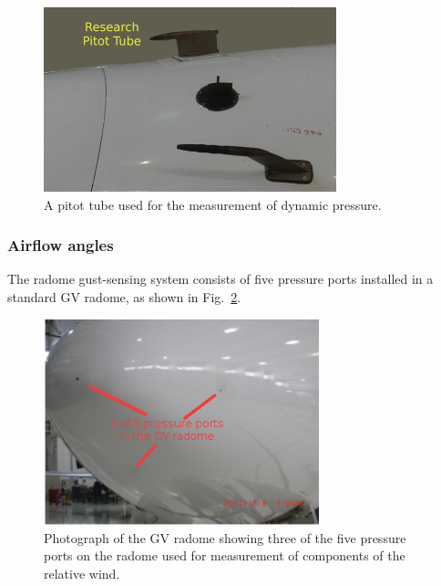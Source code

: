 \documentclass[12pt,twoside,english]{article}\usepackage[]{graphicx}\usepackage[]{color}
\let\OrgIndex\index
\renewcommand*{\index}[1]{\OrgIndex{#1}}
\begin{document}
\begin{figure}
\noindent \begin{centering}
\includegraphics[width=8.5cm]{SpecialGraphics/PitotTube-r.png}  
\par\end{centering}

\protect\caption{A pitot tube used for the measurement of dynamic pressure.\label{fig:pitot-tube-photo}}
\end{figure}



\subsubsection{Airflow angles\label{sub:Airflow-angles}}

The radome gust-sensing system consists of five pressure ports installed in a standard GV radome, as shown in Fig.~\ref{fig:radome-photo}. 
\begin{figure}
\noindent \begin{centering}
\includegraphics[width=8cm]{SpecialGraphics/RadomePhotoGV.png}  
\par\end{centering}

\protect\caption{Photograph of the GV radome showing three of the five pressure ports on the radome used for measurement of components of the relative wind.\label{fig:radome-photo}} 
\end{figure}
\end{document}
